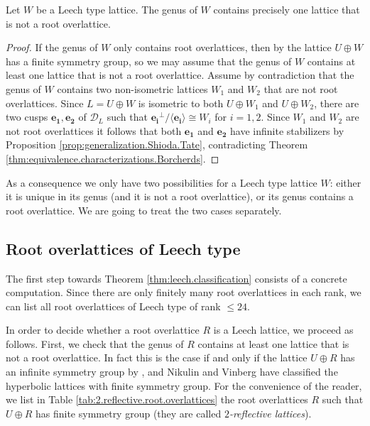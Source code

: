 \documentclass[11pt,letterpaper]{amsart}
\newcommand{\vect}[1]{\boldsymbol{#1}}
\begin{document}
\begin{proposition} \label{prop:genus.Leech.type.lattice}
Let $W$ be a Leech type lattice. The genus of $W$ contains precisely one lattice that is not a root overlattice.
\end{proposition}
\begin{proof}
If the genus of $W$ only contains root overlattices, then by \cite[Theorems~3.1.1~and~4.1.1]{nikulin.factor.groups} the lattice $U\oplus W$ has a finite symmetry group, so we may assume that the genus of $W$ contains at least one lattice that is not a root overlattice.
Assume by contradiction that the genus of $W$ contains two non-isometric lattices $W_1$ and $W_2$ that are not root overlattices. Since $L=U\oplus W$ is isometric to both $U\oplus W_1$ and $U\oplus W_2$, there are two cusps $\vect{e_1}, \vect{e_2}$ of $\mathcal{D}_L$ such that $\vect{e_i}^\perp /\langle \vect{e_i} \rangle \cong W_i$ for $i=1,2$. Since $W_1$ and $W_2$ are not root overlattices it follows that both $\vect{e_1}$ and $\vect{e_2}$ have infinite stabilizers by Proposition \ref{prop:generalization.Shioda.Tate}, contradicting Theorem \ref{thm:equivalence.characterizations.Borcherds}.
\end{proof}

As a consequence we only have two possibilities for a Leech type lattice $W$: either it is unique in its genus (and it is not a root overlattice), or its genus contains a root overlattice. We are going to treat the two cases separately.

\subsection{Root overlattices of Leech type} \label{sec:root.overlattices.Leech}

The first step towards Theorem \ref{thm:leech.classification} consists of a concrete computation. Since there are only finitely many root overlattices in each rank, we can list all root overlattices of Leech type of rank $\le 24$.

In order to decide whether a root overlattice $R$ is a Leech lattice, we proceed as follows. First, we check that the genus of $R$ contains at least one lattice that is not a root overlattice. In fact this is the case if and only if the lattice $U\oplus R$ has an infinite symmetry group by \cite[Theorems~3.1.1~and~4.1.1]{nikulin.factor.groups}, and Nikulin and Vinberg have classified the hyperbolic lattices with finite symmetry group. For the convenience of the reader, we list in Table \ref{tab:2.reflective.root.overlattices} the root overlattices $R$ such that $U\oplus R$ has finite symmetry group (they are called \emph{$2$-reflective lattices}).
\end{document}
